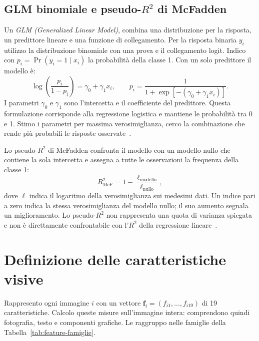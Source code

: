 \subsection{GLM binomiale e pseudo-\texorpdfstring{$R^2$}{R2} di McFadden}
\label{subsec:materiali-glm}

Un \emph{GLM (Generalized Linear Model)}, combina una distribuzione per la risposta, un predittore lineare e una funzione di collegamento. Per la risposta binaria $y_i$ utilizzo la distribuzione binomiale con una prova e il collegamento logit. Indico con $p_i=\Pr(y_i=1\mid x_i)$ la probabilità della classe 1. Con un solo predittore il modello è:
\begin{equation}
    \log\!\left(\frac{p_i}{1-p_i}\right)=\gamma_0+\gamma_1x_i,
    \qquad
    p_i=\frac{1}{1+\exp[-(\gamma_0+\gamma_1x_i)]}.
    \label{eq:materiali-glm}
\end{equation}
I parametri $\gamma_0$ e $\gamma_1$ sono l'intercetta e il coefficiente del predittore. Questa formulazione corrisponde alla regressione logistica e mantiene le probabilità tra 0 e 1. Stimo i parametri per massima verosimiglianza, cerco la combinazione che rende più probabili le risposte osservate~\cite{68aee965-a8a0-3e72-9f89-8d89ae91a62b}.

Lo pseudo-$R^2$ di McFadden confronta il modello con un modello nullo che contiene la sola intercetta e assegna a tutte le osservazioni la frequenza della classe 1:
\begin{equation}
    R^2_{\mathrm{McF}}=1-\frac{\ell_{\mathrm{modello}}}{\ell_{\mathrm{nullo}}},
    \label{eq:materiali-mcfadden}
\end{equation}
dove $\ell$ indica il logaritmo della verosimiglianza sui medesimi dati. Un indice pari a zero indica la stessa verosimiglianza del modello nullo; il suo aumento segnala un miglioramento. Lo pseudo-$R^2$ non rappresenta una quota di varianza spiegata e non è direttamente confrontabile con l'$R^2$ della regressione lineare~\cite{mcfadden1972conditional}.

\section{Definizione delle caratteristiche visive}
\label{sec:materiali-feature-visive}

Rappresento ogni immagine $i$ con un vettore $\mathbf{f}_i=(f_{i1},\ldots,f_{i19})$ di 19 caratteristiche. Calcolo queste misure sull'immagine intera: comprendono quindi fotografia, testo e componenti grafiche. Le raggruppo nelle famiglie della Tabella~\ref{tab:feature-famiglie}.

